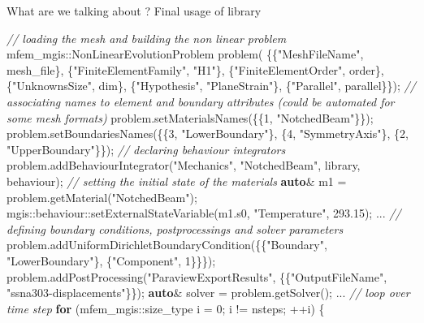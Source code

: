 \documentclass{beamer}
\newcommand{\CommentTok}[1]{\textcolor[rgb]{0.38,0.63,0.69}{\textit{#1}}}
\newcommand{\ControlFlowTok}[1]{\textcolor[rgb]{0.00,0.44,0.13}{\textbf{#1}}}
\newcommand{\DataTypeTok}[1]{\textcolor[rgb]{0.56,0.13,0.00}{#1}}
\newcommand{\DecValTok}[1]{\textcolor[rgb]{0.25,0.63,0.44}{#1}}
\newcommand{\FloatTok}[1]{\textcolor[rgb]{0.25,0.63,0.44}{#1}}
\newcommand{\KeywordTok}[1]{\textcolor[rgb]{0.00,0.44,0.13}{\textbf{#1}}}
\newcommand{\NormalTok}[1]{#1}
\newcommand{\StringTok}[1]{\textcolor[rgb]{0.25,0.44,0.63}{#1}}
\begin{document}
\begin{frame}[fragile]{What are we talking about ? Final usage of library}
  \begin{center}
      \begin{minipage}{\linewidth}
      \tiny
      \begin{Highlighting}[]
        \CommentTok{// loading the mesh and building the non linear problem}
        \NormalTok{mfem_mgis::NonLinearEvolutionProblem problem(}
        \NormalTok{    \{\{}\StringTok{"MeshFileName"}\NormalTok{, mesh_file\},  \{}\StringTok{"FiniteElementFamily"}\NormalTok{, }\StringTok{"H1"}\NormalTok{\},}
        \NormalTok{     \{}\StringTok{"FiniteElementOrder"}\NormalTok{, order\}, \{}\StringTok{"UnknownsSize"}\NormalTok{, dim\},}
        \NormalTok{     \{}\StringTok{"Hypothesis"}\NormalTok{, }\StringTok{"PlaneStrain"}\NormalTok{\}, \{}\StringTok{"Parallel"}\NormalTok{, parallel\}\});}
        \CommentTok{// associating names to element and boundary attributes (could be automated for some mesh formats)}
        \NormalTok{problem.setMaterialsNames(\{\{1, }\StringTok{"NotchedBeam"}\NormalTok{\}\});}
        \NormalTok{problem.setBoundariesNames(\{\{3, }\StringTok{"LowerBoundary"}\NormalTok{\}, \{4, }\StringTok{"SymmetryAxis"}\NormalTok{\}, \{2, }\StringTok{"UpperBoundary"}\NormalTok{\}\});}
        \CommentTok{// declaring behaviour integrators}
        \NormalTok{problem.}\NormalTok{addBehaviourIntegrator}\NormalTok{(}\StringTok{"Mechanics"}\NormalTok{, }\StringTok{"NotchedBeam"}\NormalTok{, library, behaviour);}
        \CommentTok{// setting the initial state of the materials}
        \KeywordTok{auto}\NormalTok{\& m1 = problem.getMaterial(}\StringTok{"NotchedBeam"}\NormalTok{);}
        \NormalTok{mgis::behaviour::setExternalStateVariable(m1.s0, }\StringTok{"Temperature"}\NormalTok{, }\FloatTok{293.15}\NormalTok{);}
        \NormalTok{...}
        \CommentTok{// defining boundary conditions, postprocessings and solver parameters}
        \NormalTok{problem.addUniformDirichletBoundaryCondition(\{\{}\StringTok{"Boundary"}\NormalTok{, }\StringTok{"LowerBoundary"}\NormalTok{\}, \{}\StringTok{"Component"}\NormalTok{, 1\}\}\});}
        \NormalTok{problem.addPostProcessing(}\StringTok{"ParaviewExportResults"}\NormalTok{, \{\{}\StringTok{"OutputFileName"}\NormalTok{, }\StringTok{"ssna303-displacements"}\NormalTok{\}\})};
        \KeywordTok{auto}\NormalTok{\& solver = problem.getSolver();}
        \NormalTok{...}
        \CommentTok{// loop over time step}
        \ControlFlowTok{for}\NormalTok{ (mfem\_mgis::}\DataTypeTok{size\_type}\NormalTok{ i = }\DecValTok{0}\NormalTok{; i != nsteps; ++i) \{}

\end{Highlighting}
\end{minipage}
\end{center}
\end{frame}
\end{document}
